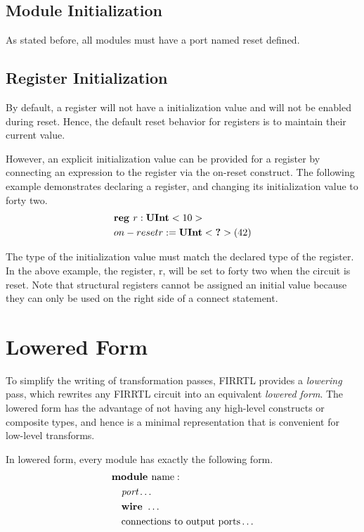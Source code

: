\documentclass[12pt]{article}
\begin{document}
\subsection{Module Initialization}
As stated before, all modules must have a port named reset defined.

\subsection{Register Initialization}
By default, a register will not have a initialization value and will not be enabled during reset.
Hence, the default reset behavior for registers is to maintain their current value.

However, an explicit initialization value can be provided for a register by connecting an expression to the register via the on-reset construct.
The following example demonstrates declaring a register, and changing its initialization value to forty two.
\[
\begin{aligned}
& \text{\bf reg\ } r : \text{\bf UInt}<10> \\
& on-reset r := \text{\bf UInt}<\text{\bf ?}>(42)
\end{aligned}
\]

The type of the initialization value must match the declared type of the register.
In the above example, the register, r, will be set to forty two when the circuit is reset.
Note that structural registers cannot be assigned an initial value because they can only be used on the right side of a connect statement.

\section{Lowered Form}

To simplify the writing of transformation passes, FIRRTL provides a {\em lowering} pass, which rewrites any FIRRTL circuit into an equivalent {\em lowered form}.
The lowered form has the advantage of not having any high-level constructs or composite types, and hence is a minimal representation that is convenient for low-level transforms. 

In lowered form, every module has exactly the following form.
\[
\begin{aligned}
&\text{\bf module\ } \text{name} :                                 \\
&\quad \text{\em port} \ldots                                   \\
&\quad \text{\bf wire\ } \ldots                                    \\
&\quad \text{connections to output ports} \ldots           \\
\end{aligned}
\]
\end{document}
